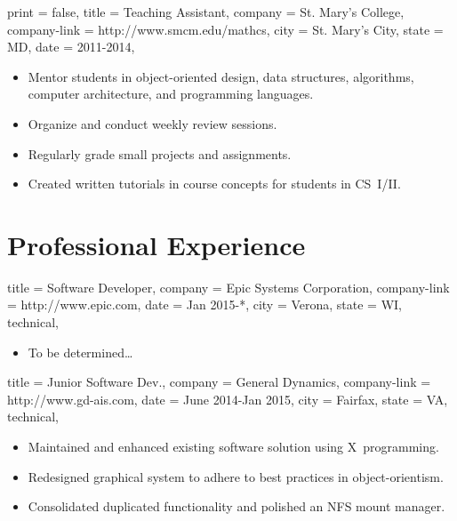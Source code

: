 \documentclass{simplecv}
\begin{document}
\begin{position}
  {
    print   = false,
    title   = Teaching Assistant,
    company = St. Mary's College,
    company-link = http://www.smcm.edu/mathcs,
    city    = St. Mary's City,
    state   = MD,
    date    = 2011-2014,
  }

\begin{itemize}
\item Mentor students in object-oriented design, data structures, algorithms, computer architecture, and programming languages.
\item Organize and conduct weekly review sessions.
\item Regularly grade small projects and assignments.
\item Created written tutorials in course concepts for students in CS~I\slash II.
\end{itemize}
\end{position}

\section{Professional Experience}

\begin{position}
  {
    title   = Software Developer,
    company = Epic Systems Corporation,
    company-link = http://www.epic.com,
    date    = Jan 2015-*,
    city    = Verona,
    state   = WI,
    technical,
  }

\begin{itemize}
\item To be determined\dots
\end{itemize}
\end{position}

\begin{position}
  {
    title   = Junior Software Dev.,
    company = General Dynamics,
    company-link = http://www.gd-ais.com,
    date    = June 2014-Jan 2015,
    city    = Fairfax,
    state   = VA,
    technical,
  }

\begin{itemize}
\item Maintained and enhanced existing software solution using X~programming.
\item Redesigned graphical system to adhere to best practices in object-orientism.
\item Consolidated duplicated functionality and polished an NFS mount manager.
\end{itemize}
\end{position}
\end{document}
